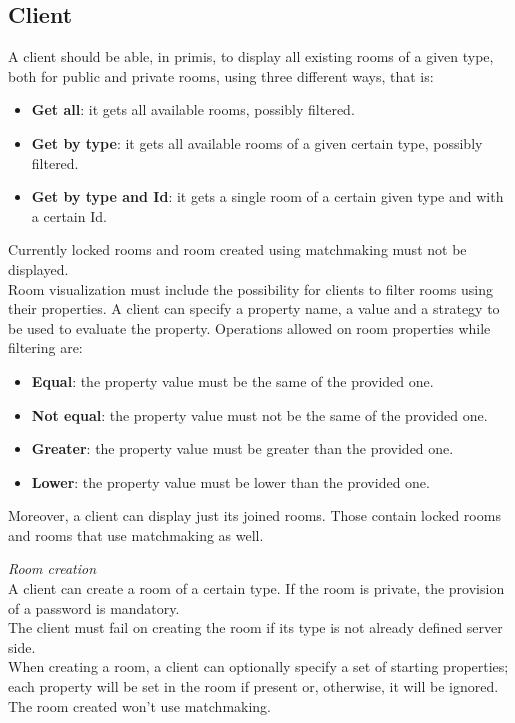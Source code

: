 \subsection{Client} \label{client}

A client should be able, in primis, to display all existing rooms of a given type, both for public and private rooms, using three different ways, that is:
\begin{itemize}
\item \textbf{Get all}: it gets all available rooms, possibly filtered.
\item \textbf{Get by type}: it gets all available rooms of a given certain type, possibly filtered.
\item \textbf{Get by type and Id}: it gets a single room of a certain given type and with a certain Id.  
\end{itemize}

Currently locked rooms and room created using matchmaking must not be displayed.
\\
Room visualization must include the possibility for clients to filter rooms using their properties. A client can specify a property name, a value and a strategy to be used to evaluate the property. Operations allowed on room properties while filtering are:
\begin{itemize}
\item \textbf{Equal}: the property value must be the same of the provided one.
\item \textbf{Not equal}: the property value must not be the same of the provided one.
\item \textbf{Greater}: the property value must be greater than the provided one.
\item \textbf{Lower}: the property value must be lower than the provided one.
\end{itemize}

Moreover, a client can display just its joined rooms. Those contain locked rooms and rooms that use matchmaking as well. 

\bigskip
\textit{Room creation}
\\
A client can create a room of a certain type. If the room is private, the provision of a password is mandatory.
\\
The client must fail on creating the room if its type is not already defined server side.
\\
When creating a room, a client can optionally specify a set of starting properties; each property will be set in the room if present or, otherwise, it will be ignored.
\\
The room created won't use matchmaking.

